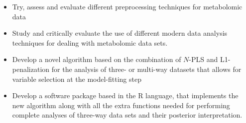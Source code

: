 \begin{itemize}
    \item Try, assess and evaluate different preprocessing techniques for metabolomic data
    \item Study and critically evaluate the use of different modern data analysis techniques for dealing with metabolomic data sets.
    \item Develop a novel algorithm based on the combination of $N$-PLS and L1-penalization for the analysis of three- or multi-way datasets that allows for variable selection at the model-fitting step
    \item Develop a software package based in the R language, that implements the new algorithm along with all the extra functions needed for performing complete analyses of three-way data sets and their posterior interpretation.
\end{itemize}
